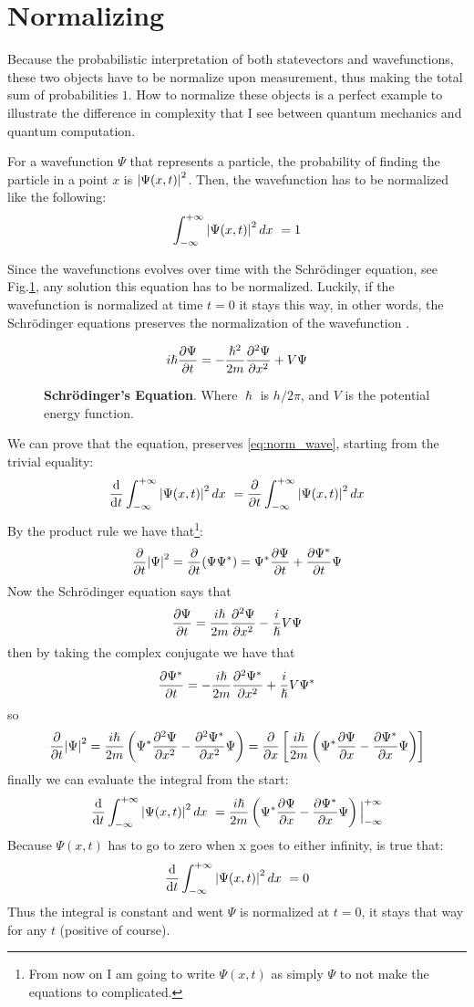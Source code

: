 \section{Normalizing}
Because the probabilistic interpretation of both statevectors and wavefunctions, these two objects have to be normalize upon measurement, thus making the total sum of probabilities $1$. How to normalize these objects is a perfect example to illustrate the difference in complexity that I see between quantum mechanics and quantum computation. 

 For a wavefunction $\Psi$ that represents a particle, the probability of finding the particle in a point $x$ is $\abs{\Psi(x,t)}^2$. Then, the wavefunction has to be normalized like the following:
\begin{equation}
\int_{-\infty}^{+\infty}\abs{\Psi(x,t)}^2\, dx\ = 1
\label{eq:norm_wave}
\end{equation}

Since the wavefunctions evolves over time with the Schrödinger equation, see Fig.\ref{fig:schro}, any solution this equation has to be normalized. Luckily, if the wavefunction is normalized at time $t=0$ it stays this way, in other words, the Schrödinger equations preserves the normalization of the wavefunction \cite{IntroQM:normalizing}. 

\begin{figure}
	$$
	i\hslash \pdv{\Psi}{t} = -\frac{\hslash^2}{2m}\pdv[2]{\Psi}{x}+V\Psi
	$$
	\caption{\textbf{Schrödinger's Equation}. Where $\hslash$ is $h/2\pi$, and $V$ is the potential energy function.}
	\label{fig:schro}
\end{figure}

We can prove that the equation, preserves \ref{eq:norm_wave}, starting from the trivial equality:
$$
\dv{t} \int_{-\infty}^{+\infty}\abs{\Psi(x,t)}^2\, dx\ = \pdv{t} \int_{-\infty}^{+\infty}\abs{\Psi(x,t)}^2\, dx
$$
By the product rule we have that\footnote{From now on I am going to write $\Psi(x,t)$ as simply $\Psi$ to not make the equations to complicated.}:
$$
\pdv{t}\abs{\Psi}^2 = \pdv{t}(\Psi\Psi^*) = \Psi^*\pdv{\Psi}{t} + \pdv{\Psi^*}{t}\Psi
$$
Now the Schrödinger equation says that 
$$
\pdv{\Psi}{t} = \frac{i\hslash}{2m}\pdv[2]{\Psi}{x} -  \frac{i}{\hslash}V\Psi
$$
then by taking the complex conjugate we have that 
$$
\pdv{\Psi^*}{t} = - \frac{i\hslash}{2m}\pdv[2]{\Psi^*}{x} + \frac{i}{\hslash}V\Psi^*
$$
so
$$
\pdv{t}\abs{\Psi}^2 = \frac{i\hslash}{2m} \left( \Psi^*\pdv[2]{\Psi}{x} - \pdv[2]{\Psi^*}{x}\Psi \right) = \pdv{x} \left[ \frac{i\hslash}{2m} \left(\Psi^*\pdv{\Psi}{x} - \pdv{\Psi^*}{x}\Psi\right)\right]
$$
finally we can evaluate the integral from the start:
$$
\dv{t} \int_{-\infty}^{+\infty}\abs{\Psi(x,t)}^2\, dx\ = \frac{i\hslash}{2m} \left( \Psi^*\pdv{\Psi}{x} - \pdv{\Psi^*}{x}\Psi \right) \Big|_{-\infty}^{+\infty}
$$
Because $\Psi(x,t)$ has to go to zero when x goes to either infinity, is true that:
$$
\dv{t} \int_{-\infty}^{+\infty}\abs{\Psi(x,t)}^2\, dx\ = 0
$$
Thus the integral is constant and went $\Psi$ is normalized at $t=0$, it stays that way for any $t$ (positive of course). 

